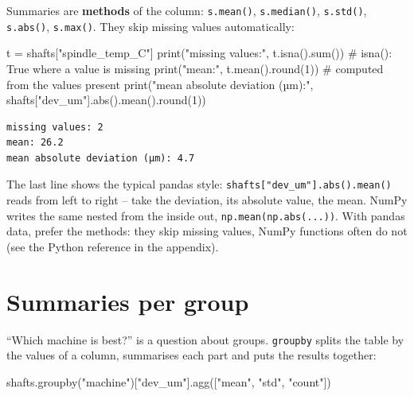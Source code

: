 \documentclass[
  letterpaper,
  DIV=11,
  numbers=noendperiod]{scrreprt}
\newenvironment{Shaded}{\begin{snugshade}}{\end{snugshade}}
\newcommand{\BuiltInTok}[1]{\textcolor[rgb]{0.00,0.23,0.31}{#1}}
\newcommand{\CommentTok}[1]{\textcolor[rgb]{0.37,0.37,0.37}{#1}}
\newcommand{\DecValTok}[1]{\textcolor[rgb]{0.68,0.00,0.00}{#1}}
\newcommand{\NormalTok}[1]{\textcolor[rgb]{0.00,0.23,0.31}{#1}}
\newcommand{\OperatorTok}[1]{\textcolor[rgb]{0.37,0.37,0.37}{#1}}
\newcommand{\StringTok}[1]{\textcolor[rgb]{0.13,0.47,0.30}{#1}}
\begin{document}
Summaries are \textbf{methods} of the column: \texttt{s.mean()},
\texttt{s.median()}, \texttt{s.std()}, \texttt{s.abs()},
\texttt{s.max()}. They skip missing values automatically:

\begin{Shaded}
\begin{Highlighting}[]
\NormalTok{t }\OperatorTok{=}\NormalTok{ shafts[}\StringTok{"spindle\_temp\_C"}\NormalTok{]}
\BuiltInTok{print}\NormalTok{(}\StringTok{"missing values:"}\NormalTok{, t.isna().}\BuiltInTok{sum}\NormalTok{())          }\CommentTok{\# isna(): True where a value is missing}
\BuiltInTok{print}\NormalTok{(}\StringTok{"mean:"}\NormalTok{, t.mean().}\BuiltInTok{round}\NormalTok{(}\DecValTok{1}\NormalTok{))                 }\CommentTok{\# computed from the values present}
\BuiltInTok{print}\NormalTok{(}\StringTok{"mean absolute deviation (µm):"}\NormalTok{, shafts[}\StringTok{"dev\_um"}\NormalTok{].}\BuiltInTok{abs}\NormalTok{().mean().}\BuiltInTok{round}\NormalTok{(}\DecValTok{1}\NormalTok{))}
\end{Highlighting}
\end{Shaded}

\begin{verbatim}
missing values: 2
mean: 26.2
mean absolute deviation (µm): 4.7
\end{verbatim}

The last line shows the typical pandas style:
\texttt{shafts{[}"dev\_um"{]}.abs().mean()} reads from left to right --
take the deviation, its absolute value, the mean. NumPy writes the same
nested from the inside out, \texttt{np.mean(np.abs(...))}. With pandas
data, prefer the methods: they skip missing values, NumPy functions
often do not (see the Python reference in the appendix).

\section*{Summaries per group}\label{summaries-per-group}


``Which machine is best?'' is a question about groups. \texttt{groupby}
splits the table by the values of a column, summarises each part and
puts the results together:

\begin{Shaded}
\begin{Highlighting}[]
\NormalTok{shafts.groupby(}\StringTok{"machine"}\NormalTok{)[}\StringTok{"dev\_um"}\NormalTok{].agg([}\StringTok{"mean"}\NormalTok{, }\StringTok{"std"}\NormalTok{, }\StringTok{"count"}\NormalTok{])}
\end{Highlighting}
\end{Shaded}
\end{document}
